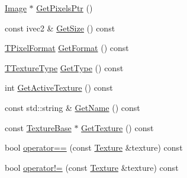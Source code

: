 \begin{DoxyCompactItemize}
\item 
\hyperlink{class_agmd_1_1_image}{Image} $\ast$ \hyperlink{class_agmd_1_1_texture_a046c0b2f42f39f64ef74def7f1f05233}{Get\+Pixels\+Ptr} ()
\item 
const ivec2 \& \hyperlink{class_agmd_1_1_texture_ad0bc7071cb4a1d0c7a0a68200c815c5d}{Get\+Size} () const 
\item 
\hyperlink{namespace_agmd_afc48fd9fa5dccb4c5621c052bfd1a7ec}{T\+Pixel\+Format} \hyperlink{class_agmd_1_1_texture_a14d772d75da1436a9987f80da0e81532}{Get\+Format} () const 
\item 
\hyperlink{namespace_agmd_a7036bece09449a930cfec410f75e85f4}{T\+Texture\+Type} \hyperlink{class_agmd_1_1_texture_a145fb653b1aedb53ab3e0702edd8954d}{Get\+Type} () const 
\item 
int \hyperlink{class_agmd_1_1_texture_a2e31e968f8e615800e98d7e77bf4a3da}{Get\+Active\+Texture} () const 
\item 
const std\+::string \& \hyperlink{class_agmd_1_1_texture_aeb19b9712c2fffaa9eb1391cf6ca2eec}{Get\+Name} () const 
\item 
const \hyperlink{class_agmd_1_1_texture_base}{Texture\+Base} $\ast$ \hyperlink{class_agmd_1_1_texture_a62313bf0a9d534c64ae9071d4dc0f200}{Get\+Texture} () const 
\item 
bool \hyperlink{class_agmd_1_1_texture_ab7153c28be2c58b62b7eb88d7e20f83a}{operator==} (const \hyperlink{class_agmd_1_1_texture}{Texture} \&texture) const 
\item 
bool \hyperlink{class_agmd_1_1_texture_a0e5814c8c548faeb35cc93b56404b7a2}{operator!=} (const \hyperlink{class_agmd_1_1_texture}{Texture} \&texture) const 
\end{DoxyCompactItemize}
